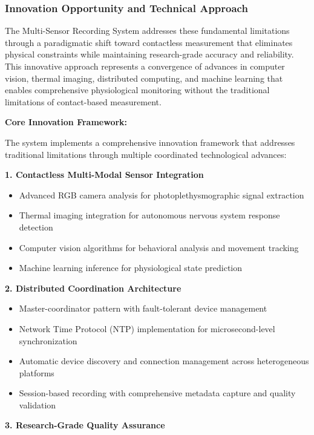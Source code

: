 \documentclass[12pt,a4paper]{report}
\begin{document}
\subsubsection{Innovation Opportunity and Technical Approach}

The Multi-Sensor Recording System addresses these fundamental limitations through a paradigmatic shift toward
contactless measurement that eliminates physical constraints while maintaining research-grade accuracy and reliability.
This innovative approach represents a convergence of advances in computer vision, thermal imaging, distributed
computing, and machine learning that enables comprehensive physiological monitoring without the traditional limitations
of contact-based measurement.

\textbf{Core Innovation Framework:}

The system implements a comprehensive innovation framework that addresses traditional limitations through multiple
coordinated technological advances:

\textbf{1. Contactless Multi-Modal Sensor Integration}

\begin{itemize}
\item Advanced RGB camera analysis for photoplethysmographic signal extraction
\item Thermal imaging integration for autonomous nervous system response detection
\item Computer vision algorithms for behavioral analysis and movement tracking
\item Machine learning inference for physiological state prediction

\end{itemize}
\textbf{2. Distributed Coordination Architecture}

\begin{itemize}
\item Master-coordinator pattern with fault-tolerant device management
\item Network Time Protocol (NTP) implementation for microsecond-level synchronization
\item Automatic device discovery and connection management across heterogeneous platforms
\item Session-based recording with comprehensive metadata capture and quality validation

\end{itemize}
\textbf{3. Research-Grade Quality Assurance}
\end{document}
